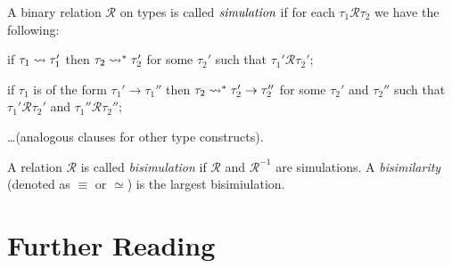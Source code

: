 \begin{defin}
  A binary relation $\mathcal{R}$ on types is called $\emph{simulation}$
  if for each $\tau_1\mathrel{\mathcal{R}} \tau_2$ we have the following:
  \begin{thmenumerate}
  \item if $\tau_1 \leadsto \tau_1'$ then
    $\tau_2 \leadsto^* \tau_2'$
    for some $\tau_2'$
    such that $\tau_1' \mathrel{\mathcal{R}} \tau_2'$;
  \item if $\tau_1$ is of the form $\tau_1' \to \tau_1''$
    then $\tau_2 \leadsto^* \tau_2' \to \tau_2''$
    for some $\tau_2'$ and $\tau_2''$
    such that $\tau_1' \mathrel{\mathcal{R}} \tau_2'$
    and $\tau_1'' \mathrel{\mathcal{R}} \tau_2''$;
  \item \ldots (analogous clauses for other type constructs).
  \end{thmenumerate}
  A relation $\mathcal{R}$ is called \emph{bisimulation}
  if $\mathcal{R}$ and $\mathcal{R}^{-1}$ are simulations.
  A \emph{bisimilarity} (denoted as $\equiv$ or $\simeq$)
  is the largest bisimiulation.
\end{defin}

\section{Further Reading}
